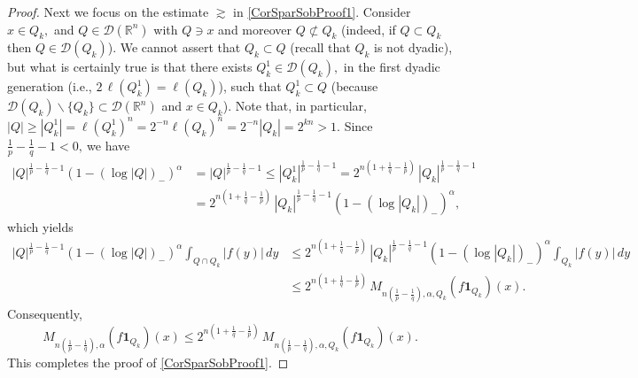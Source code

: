 \documentclass[10pt,a4paper]{amsart}
\begin{document}
\begin{proof}
Next we focus on the estimate $\gtrsim$ in \eqref{CorSparSobProof1}. Consider
$x\in Q_{k},$ and $Q\in\mathcal{D}(\mathbb{R}^{n})$ with $Q\ni x$ and moreover
$Q\not \subset Q_{k}$ (indeed, if $Q\subset Q_{k}$ then $Q\in\mathcal{D}%
(Q_{k})$). We cannot assert that $Q_{k}\subset Q$ (recall that $Q_{k}$ is not
dyadic), but what is certainly true is that there exists $Q_{k}^{1}%
\in\mathcal{D}(Q_{k}),$ in the first dyadic generation (i.e., $2\,\ell
(Q_{k}^{1})=\ell(Q_{k})$), such that $Q_{k}^{1}\subset Q$ (because
$\mathcal{D}(Q_{k})\backslash\{Q_{k}\}\subset\mathcal{D}(\mathbb{R}^{n})$ and
$x\in Q_{k}$). Note that, in particular, $|Q|\geq|Q_{k}^{1}|=\ell(Q_{k}%
^{1})^{n}=2^{-n}\ell(Q_{k})^{n}=2^{-n}|Q_{k}|=2^{kn}>1$. Since $\frac{1}%
{p}-\frac{1}{q}-1<0,\ $we have
\begin{align*}
|Q|^{\frac{1}{p}-\frac{1}{q}-1}(1-(\log|Q|)_{-})^{\alpha}  &  =|Q|^{\frac
{1}{p}-\frac{1}{q}-1}\leq|Q_{k}^{1}|^{\frac{1}{p}-\frac{1}{q}-1}%
=2^{n(1+\frac{1}{q}-\frac{1}{p})}\,|Q_{k}|^{\frac{1}{p}-\frac{1}{q}-1}\\
&  =2^{n(1+\frac{1}{q}-\frac{1}{p})}\,|Q_{k}|^{\frac{1}{p}-\frac{1}{q}%
-1}(1-(\log|Q_{k}|)_{-})^{\alpha},
\end{align*}
which yields
\begin{align*}
|Q|^{\frac{1}{p}-\frac{1}{q}-1}(1-(\log|Q|)_{-})^{\alpha}\int_{Q\cap Q_{k}%
}|f(y)|\,dy  &  \leq 2^{n(1+\frac{1}{q}-\frac{1}{p})}\,|Q_{k}|^{\frac{1}{p}%
-\frac{1}{q}-1}(1-(\log|Q_{k}|)_{-})^{\alpha}\int_{Q_{k}}|f(y)|\,dy\\
&  \leq2^{n(1+\frac{1}{q}-\frac{1}{p})}\,M_{n(\frac{1}{p}%
-\frac{1}{q}),\alpha,Q_{k}}(f\mathbf{1}_{Q_{k}})(x).
\end{align*}
Consequently,
\[
M_{n(\frac{1}{p}-\frac{1}{q}),\alpha}(f\mathbf{1}_{Q_{k}})(x)\leq
2^{n(1+\frac{1}{q}-\frac{1}{p})}\,M_{n(\frac{1}{p}-\frac{1}{q}),\alpha,Q_{k}%
}(f\mathbf{1}_{Q_{k}})(x).
\]
This completes the proof of \eqref{CorSparSobProof1}.


\end{proof}
\end{document}
